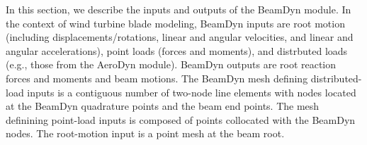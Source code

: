 \documentclass{aiaa-tc}
\newcommand{\mas}[1]{\textcolor{magenta}{#1}}
\begin{document}
In this section, we describe the inputs and outputs of the BeamDyn module.  In the context of wind turbine blade modeling, 
BeamDyn inputs are root motion (including displacements/rotations, linear and angular velocities, and linear and angular accelerations), point loads (forces and moments), and distrbuted loads (e.g., those from the AeroDyn module). BeamDyn outputs are root reaction forces and moments and beam motions. 
The BeamDyn mesh defining distributed-load inputs is a contiguous number of two-node line elements with nodes located at the BeamDyn quadrature points and the beam end points.  The mesh definining point-load inputs is composed of points collocated with the BeamDyn nodes.  The root-motion input is a point mesh at the beam root.  

\end{document}

